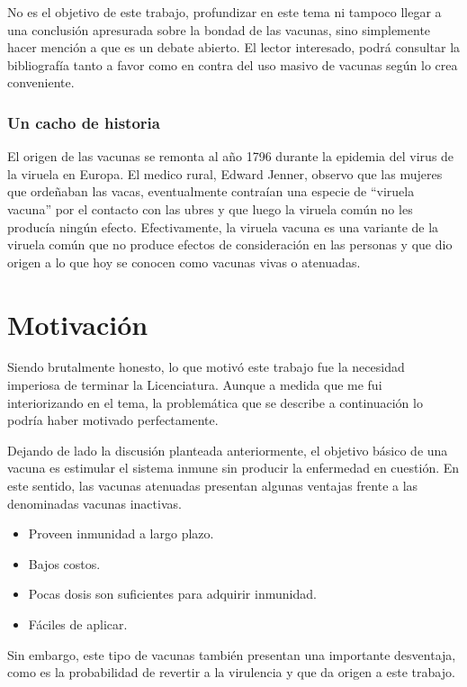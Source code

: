 No es el objetivo de este trabajo, profundizar en este tema ni tampoco llegar
a una conclusi\'on apresurada sobre la bondad de las vacunas, sino simplemente
hacer menci\'on a que es un debate abierto. El lector interesado, podr\'a
consultar la bibliograf\'ia tanto a favor como en contra del uso
masivo de vacunas seg\'un lo crea conveniente.

\subsubsection{Un cacho de historia}

El origen de las vacunas se remonta al a\~no 1796 durante la epidemia del virus
de la viruela en Europa. El medico rural, Edward Jenner, observo que las
mujeres que orde\~naban las vacas, eventualmente contra\'ian una especie de
``viruela vacuna'' por el contacto con las ubres y que luego la viruela com\'un
no les produc\'ia ning\'un efecto. Efectivamente, la viruela vacuna es una
variante de la viruela com\'un que no produce efectos de consideraci\'on en las
personas y que dio origen a lo que hoy se conocen como vacunas vivas o
atenuadas.

\section{Motivaci\'on}
\label{motivacion}
Siendo brutalmente honesto, lo que motiv\'o este trabajo fue la necesidad
imperiosa de terminar la Licenciatura. Aunque a medida que me fui
interiorizando en el tema, la problem\'atica que se describe a continuaci\'on lo
podr\'ia haber motivado perfectamente.

Dejando de lado la discusi\'on planteada anteriormente, el objetivo b\'asico de
una vacuna es estimular el sistema inmune sin producir la enfermedad en
cuesti\'on. En este sentido, las vacunas atenuadas presentan algunas ventajas
frente a las denominadas vacunas inactivas.
\begin{itemize}
 \item Proveen inmunidad a largo plazo.
 \item Bajos costos.
 \item Pocas dosis son suficientes para adquirir inmunidad. 
 \item F\'aciles de aplicar.
\end{itemize}

Sin embargo, este tipo de vacunas tambi\'en presentan una importante desventaja,
como es la probabilidad de revertir a la virulencia y que da origen a este
trabajo.

